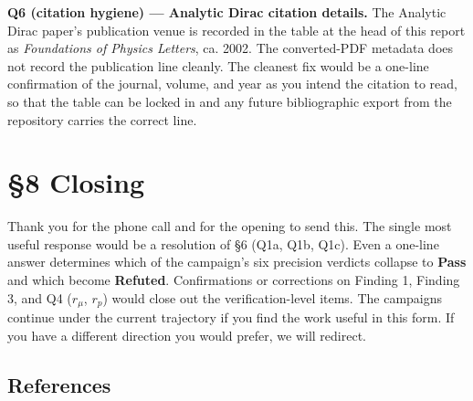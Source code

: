 \documentclass[
  11pt,
]{article}
\begin{document}
\textbf{Q6 (citation hygiene) --- Analytic Dirac citation details.} The
Analytic Dirac paper's publication venue is recorded in the table at the
head of this report as \emph{Foundations of Physics Letters}, ca. 2002.
The converted-PDF metadata does not record the publication line cleanly.
The cleanest fix would be a one-line confirmation of the journal,
volume, and year as you intend the citation to read, so that the table
can be locked in and any future bibliographic export from the repository
carries the correct line.

\hypertarget{closing}{%
\section{§8 Closing}\label{closing}}

Thank you for the phone call and for the opening to send this. The
single most useful response would be a resolution of §6 (Q1a, Q1b, Q1c).
Even a one-line answer determines which of the campaign's six precision
verdicts collapse to \textbf{Pass} and which become \textbf{Refuted}.
Confirmations or corrections on Finding 1, Finding 3, and Q4
(\(r_{\mu}\), \(r_{p}\)) would close out the verification-level items.
The campaigns continue under the current trajectory if you find the work
useful in this form. If you have a different direction you would prefer,
we will redirect.

\hypertarget{references}{%
\subsection{References}\label{references}}
\end{document}
